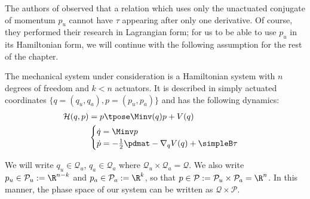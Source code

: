 The authors of
\cite{nhvc_dynamic_walking,hybrid_zero_dynamics_bipedal_nhvcs,nhvc_incline_walking}
observed that a relation which uses only the unactuated conjugate of momentum
\(p_u\) cannot have \(\tau\) appearing after only one derivative. Of course,
they performed their research in Lagrangian form; 
for us to be able to use \(p_u\) in its Hamiltonian form, 
we will continue with the following assumption for the rest of the chapter.

\begin{assm}\label{assm:H-is-simply-actuated}
    The mechanical system under consideration is a
    Hamiltonian system with \(n\) degrees of freedom and 
    \(k < n\) actuators. It is described in simply
    actuated coordinates \(\{q = (q_u,q_a), p = (p_u, p_a)\}\) and has the
    following dynamics:
    \begin{align*}
        \mathcal{H}(q,p) &= p\tpose \Minv(q) p + V(q) \\
         &\begin{cases}
            \dot{q} = \Minv p \\
            \dot{p} = -\frac{1}{2} \pdmat - \nabla_q V(q) + \simpleB \tau \\
        \end{cases}
    \end{align*}
\end{assm}
\begin{notation}
    We will write \(q_u \in \mathcal{Q}_u\), \(q_a \in \mathcal{Q}_a\) where
    \(\mathcal{Q}_u \times \mathcal{Q}_a = \mathcal{Q}\). 
    We also write
    \(p_u \in \mathcal{P}_u := \R^{n-k}\) and 
    \(p_a \in \mathcal{P}_a := \R^k\), so that 
    \(p \in \mathcal{P} := \mathcal{P}_u \times \mathcal{P}_a = \R^n\). 
    In this manner, the phase space of our system can be written as
    \(\mathcal{Q} \times \mathcal{P}\).
\end{notation}

